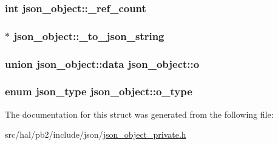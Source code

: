 \subsubsection[{\texorpdfstring{\+\_\+ref\+\_\+count}{_ref_count}}]{\setlength{\rightskip}{0pt plus 5cm}int json\+\_\+object\+::\+\_\+ref\+\_\+count}\hypertarget{structjson__object_aca9b93573ba6bb8cf66d87c170a575b2}{}\label{structjson__object_aca9b93573ba6bb8cf66d87c170a575b2}
\subsubsection[{\texorpdfstring{\+\_\+to\+\_\+json\+\_\+string}{_to_json_string}}]{$\ast$ json\+\_\+object\+::\+\_\+to\+\_\+json\+\_\+string}\hypertarget{structjson__object_a077a02daac4653f91584dd7f47c3d632}{}\label{structjson__object_a077a02daac4653f91584dd7f47c3d632}
\subsubsection[{\texorpdfstring{o}{o}}]{\setlength{\rightskip}{0pt plus 5cm}union {\bf json\+\_\+object\+::data}  json\+\_\+object\+::o}\hypertarget{structjson__object_a33aff83ffea02b934235c4821cca8cf0}{}\label{structjson__object_a33aff83ffea02b934235c4821cca8cf0}
\subsubsection[{\texorpdfstring{o\+\_\+type}{o_type}}]{\setlength{\rightskip}{0pt plus 5cm}enum {\bf json\+\_\+type} json\+\_\+object\+::o\+\_\+type}\hypertarget{structjson__object_a28307a4a3fe6cefe27e28fec56b76b3e}{}\label{structjson__object_a28307a4a3fe6cefe27e28fec56b76b3e}


The documentation for this struct was generated from the following file\+:\begin{DoxyCompactItemize}
\item 
src/hal/pb2/include/json/\hyperlink{json__object__private_8h}{json\+\_\+object\+\_\+private.\+h}\end{DoxyCompactItemize}
